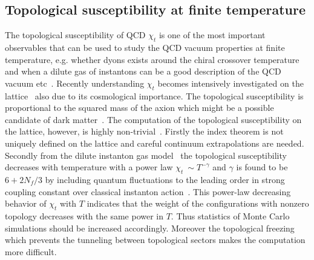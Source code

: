 \documentclass{PoS}
\begin{document}
\subsection{Topological susceptibility at finite temperature}
\label{sec:topsus}





The topological susceptibility of QCD $\chi_t$ is one of the most important observables that can be used to study the QCD vacuum properties at finite temperature, e.g. whether dyons exists around the chiral
crossover temperature and when a dilute gas of instantons can be a good description of the QCD vacuum etc~\cite{Gross:1980br}. Recently understanding $\chi_t$ becomes intensively investigated on the lattice~\cite{Berkowitz:2015aua,
Kitano:2015fla,Borsanyi:2015cka,Petreczky:2016vrs,Bonati:2015vqz,Taniguchi:2016tjc,Borsanyi:2016ksw} also due to its cosmological importance. 
The topological susceptibility is proportional to the squared mass of the axion which might be a possible candidate of dark matter~\cite{Marsh:2015xka}. The computation of the topological susceptibility on the lattice, however, is highly non-trivial~\cite{Vicari:2008jw}. 
Firstly the index theorem is not uniquely defined on the lattice and careful continuum extrapolations are needed. Secondly from the dilute instanton gas model~\cite{Gross:1980br} 
the topological susceptibility decreases with temperature with a power law $\chi_t~\sim T^{-\gamma}$ and $\gamma$ is found to be $6+2N_f/3$ by including quantum fluctuations to
the leading order in strong coupling constant over classical instanton action~\cite{Ringwald:1999ze}. This power-law decreasing behavior of $\chi_t$ with $T$
indicates that the weight of the configurations with nonzero topology decreases with the same power in $T$. Thus statistics of Monte Carlo simulations should be increased accordingly. 
Moreover the topological freezing which prevents the tunneling between topological sectors makes the computation more difficult.
\end{document}
